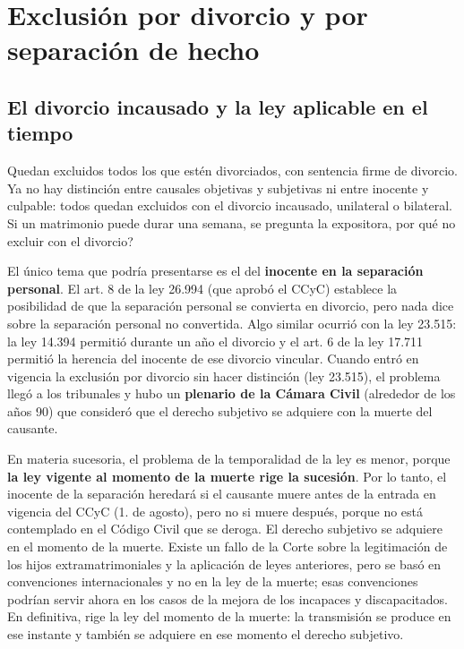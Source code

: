 \documentclass[12pt,oneside]{book}
\begin{document}
\section{Exclusión por divorcio y por separación de hecho}

\subsection{El divorcio incausado y la ley aplicable en el tiempo}

Quedan excluidos todos los que estén divorciados, con sentencia firme de divorcio. Ya no hay distinción entre causales objetivas y subjetivas ni entre inocente y culpable: todos quedan excluidos con el divorcio incausado, unilateral o bilateral. Si un matrimonio puede durar una semana, se pregunta la expositora, \textquestiondown{}por qué no excluir con el divorcio?

El único tema que podría presentarse es el del \textbf{inocente en la separación personal}. El art. 8 de la ley 26.994 (que aprobó el CCyC) establece la posibilidad de que la separación personal se convierta en divorcio, pero nada dice sobre la separación personal no convertida. Algo similar ocurrió con la ley 23.515: la ley 14.394 permitió durante un año el divorcio y el art. 6 de la ley 17.711 permitió la herencia del inocente de ese divorcio vincular. Cuando entró en vigencia la exclusión por divorcio sin hacer distinción (ley 23.515), el problema llegó a los tribunales y hubo un \textbf{plenario de la Cámara Civil} (alrededor de los años 90) que consideró que el derecho subjetivo se adquiere con la muerte del causante.

En materia sucesoria, el problema de la temporalidad de la ley es menor, porque \textbf{la ley vigente al momento de la muerte rige la sucesión}. Por lo tanto, el inocente de la separación heredará si el causante muere antes de la entrada en vigencia del CCyC (1.\textordmasculine{} de agosto), pero no si muere después, porque no está contemplado en el Código Civil que se deroga. El derecho subjetivo se adquiere en el momento de la muerte. Existe un fallo de la Corte sobre la legitimación de los hijos extramatrimoniales y la aplicación de leyes anteriores, pero se basó en convenciones internacionales y no en la ley de la muerte; esas convenciones podrían servir ahora en los casos de la mejora de los incapaces y discapacitados. En definitiva, rige la ley del momento de la muerte: la transmisión se produce en ese instante y también se adquiere en ese momento el derecho subjetivo.
\end{document}
